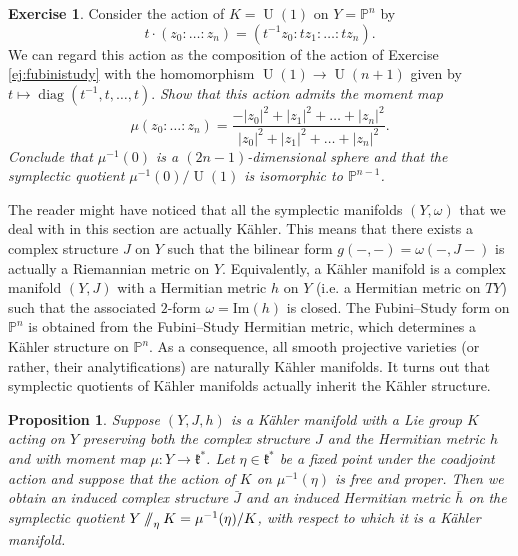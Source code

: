 \documentclass[12pt,a4paper]{amsbook}
\newtheorem{prop}[thm]{Proposition}
\theoremstyle{remark} \newtheorem{rmk}[thm]{Remark}
\theoremstyle{definition} \newtheorem{defn}[thm]{Definition}
\theoremstyle{definition} \newtheorem{ex}[thm]{Example}
\theoremstyle{definition} \newtheorem{ej}{Exercise}
\newcommand{\git}{\mathbin{/\mkern-6mu/}}
\newcommand{\bbP}{\mathbb P}
\newcommand{\fk}{\mathfrak k}
\DeclareMathOperator{\U}{U}
\DeclareMathOperator{\diag}{diag}
\begin{document}
\begin{ej} \label{ej:fubinistudy2}
  Consider the action of $K=\U(1)$ on $Y=\bbP^n$ by
  \begin{equation*}
t\cdot (z_0:\dots:z_n) = (t^{-1}z_0:tz_1:\dots:tz_n).
  \end{equation*}
  We can regard this action as the composition of the action of Exercise \ref{ej:fubinistudy} with the homomorphism $\U(1)\rightarrow \U(n+1)$ given by $t \mapsto \diag(t^{-1},t,\dots,t)$. \textit{Show that this action admits the moment map}
  \begin{equation*}
\mu(z_0:\dots:z_n) = \frac{-\lvert z_0\rvert^2 + \lvert z_1\rvert^2 + \dots + \lvert z_n\rvert^2}{\lvert z_0\rvert^2 + \lvert z_1\rvert^2 + \dots + \lvert z_n\rvert^2}.
  \end{equation*}
 \textit{Conclude that $\mu^{-1}(0)$ is a $(2n-1)$-dimensional sphere and that the symplectic quotient $\mu^{-1}(0)/ \U(1)$ is isomorphic to $\bbP^{n-1}$.}
\end{ej}

The reader might have noticed that all the symplectic manifolds $(Y,\omega)$ that we deal with in this section are actually Kähler. This means that there exists a complex structure $J$ on $Y$ such that the bilinear form $g(-,-)=\omega(-,J-)$ is actually a Riemannian metric on $Y$. Equivalently, a Kähler manifold is a complex manifold $(Y,J)$ with a Hermitian metric $h$ on $Y$ (i.e. a Hermitian metric on $TY$) such that the associated $2$-form $\omega=\mathrm{Im}(h)$ is closed. The Fubini--Study form on $\bbP^n$ is obtained from the Fubini--Study Hermitian metric, which determines a Kähler structure on $\bbP^n$. As a consequence, all smooth projective varieties (or rather, their analytifications) are naturally Kähler manifolds. It turns out that symplectic quotients of Kähler manifolds actually inherit the Kähler structure.

\begin{prop}
Suppose $(Y,J,h)$ is a Kähler manifold with a Lie group $K$ acting on $Y$ preserving both the complex structure $J$ and the Hermitian metric $h$ and with moment map $\mu:Y\rightarrow \fk^*$. Let $\eta \in \fk^*$ be a fixed point under the coadjoint action and suppose that the action of $K$ on $\mu^{-1}(\eta)$ is free and proper. Then we obtain an induced complex structure $\bar{J}$ and an induced Hermitian metric $\bar{h}$ on the symplectic quotient $Y\git_\eta K = \mu^{-1}(\eta)/K$, with respect to which it is a Kähler manifold.
\end{prop}
\end{document}
